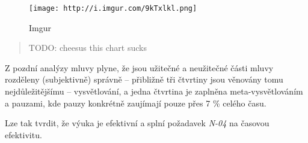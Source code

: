 \begin{figure}
\centering
\texttt{[image: http://i.imgur.com/9kTxlkl.png]}
\caption{Imgur}
\end{figure}

\begin{quote}
TODO: cheesus this chart sucks
\end{quote}

Z pozdní analýzy mluvy plyne, že jsou užitečné a neužitečné části mluvy
rozděleny (subjektivně) správně -- přibližně tři čtvrtiny jsou věnovány
tomu nejdůležitějšímu -- vysvětlování, a jedna čtvrtina je zaplněna
meta-vysvětlováním a pauzami, kde pauzy konkrétně zaujímají pouze přes 7
\% celého času.

Lze tak tvrdit, že výuka je efektivní a splní požadavek \emph{N-04} na
časovou efektivitu.
